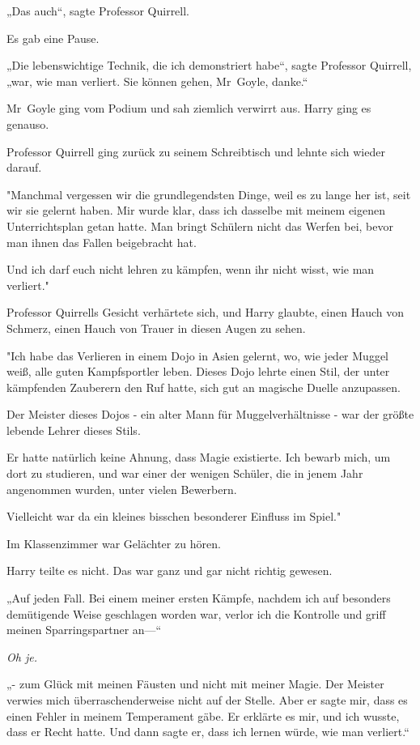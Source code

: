 {„Das auch“, sagte Professor Quirrell.

Es gab eine Pause.

„Die lebenswichtige Technik, die ich demonstriert habe“, sagte Professor Quirrell, „war, wie man verliert. Sie können gehen, Mr~Goyle, danke.“

Mr~Goyle ging vom Podium und sah ziemlich verwirrt aus. Harry ging es genauso.

Professor Quirrell ging zurück zu seinem Schreibtisch und lehnte sich wieder darauf.

"Manchmal vergessen wir die grundlegendsten Dinge, weil es zu lange her ist, seit wir sie gelernt haben. Mir wurde klar, dass ich dasselbe mit meinem eigenen Unterrichtsplan getan hatte. Man bringt Schülern nicht das Werfen bei, bevor man ihnen das Fallen beigebracht hat.

Und ich darf euch nicht lehren zu kämpfen, wenn ihr nicht wisst, wie man verliert."

Professor Quirrells Gesicht verhärtete sich, und Harry glaubte, einen Hauch von Schmerz, einen Hauch von Trauer in diesen Augen zu sehen.

"Ich habe das Verlieren in einem Dojo in Asien gelernt, wo, wie jeder Muggel weiß, alle guten Kampfsportler leben. Dieses Dojo lehrte einen Stil, der unter kämpfenden Zauberern den Ruf hatte, sich gut an magische Duelle anzupassen.

Der Meister dieses Dojos - ein alter Mann für Muggelverhältnisse - war der größte lebende Lehrer dieses Stils.

Er hatte natürlich keine Ahnung, dass Magie existierte. Ich bewarb mich, um dort zu studieren, und war einer der wenigen Schüler, die in jenem Jahr angenommen wurden, unter vielen Bewerbern.

Vielleicht war da ein kleines bisschen besonderer Einfluss im Spiel."

Im Klassenzimmer war Gelächter zu hören.

Harry teilte es nicht. Das war ganz und gar nicht richtig gewesen.

„Auf jeden Fall. Bei einem meiner ersten Kämpfe, nachdem ich auf besonders demütigende Weise geschlagen worden war, verlor ich die Kontrolle und griff meinen Sparringspartner an—“

\emph{Oh je.}

„- zum Glück mit meinen Fäusten und nicht mit meiner Magie. Der Meister verwies mich überraschenderweise nicht auf der Stelle. Aber er sagte mir, dass es einen Fehler in meinem Temperament gäbe. Er erklärte es mir, und ich wusste, dass er Recht hatte. Und dann sagte er, dass ich lernen würde, wie man verliert.“

}
